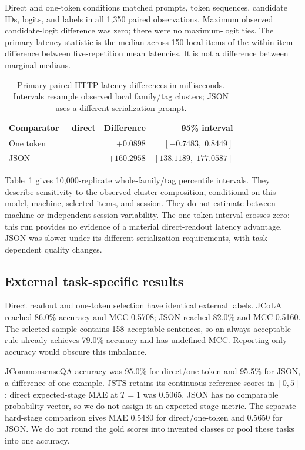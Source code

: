 \documentclass[11pt]{article}
\begin{document}
Direct and one-token conditions matched prompts, token sequences, candidate IDs, logits, and labels in all 1,350 paired observations. Maximum observed candidate-logit difference was zero; there were no maximum-logit ties. The primary latency statistic is the median across 150 local items of the within-item difference between five-repetition mean latencies. It is not a difference between marginal medians.

\begin{table}[t]
\centering
\small
\setlength{\tabcolsep}{3pt}
\begin{tabular}{@{}lrr@{}}
\toprule
Comparator $-$ direct & Difference & 95\% interval \\
\midrule
One token & $+0.0898$ & $[-0.7483,\;0.8449]$ \\
JSON & $+160.2958$ & $[138.1189,\;177.0587]$ \\
\bottomrule
\end{tabular}
\caption{Primary paired HTTP latency differences in milliseconds. Intervals resample observed local family/tag clusters; JSON uses a different serialization prompt.}
\label{tab:latency}
\end{table}

Table~\ref{tab:latency} gives 10,000-replicate whole-family/tag percentile intervals. They describe sensitivity to the observed cluster composition, conditional on this model, machine, selected items, and session. They do not estimate between-machine or independent-session variability. The one-token interval crosses zero: this run provides no evidence of a material direct-readout latency advantage. JSON was slower under its different serialization requirements, with task-dependent quality changes.

\subsection{External task-specific results}
Direct readout and one-token selection have identical external labels. JCoLA reached 86.0\% accuracy and MCC 0.5708; JSON reached 82.0\% and MCC 0.5160. The selected sample contains 158 acceptable sentences, so an always-acceptable rule already achieves 79.0\% accuracy and has undefined MCC. Reporting only accuracy would obscure this imbalance.

JCommonsenseQA accuracy was 95.0\% for direct/one-token and 95.5\% for JSON, a difference of one example. JSTS retains its continuous reference scores in $[0,5]$: direct expected-stage MAE at $T=1$ was 0.5065. JSON has no comparable probability vector, so we do not assign it an expected-stage metric. The separate hard-stage comparison gives MAE 0.5480 for direct/one-token and 0.5650 for JSON. We do not round the gold scores into invented classes or pool these tasks into one accuracy.
\end{document}
